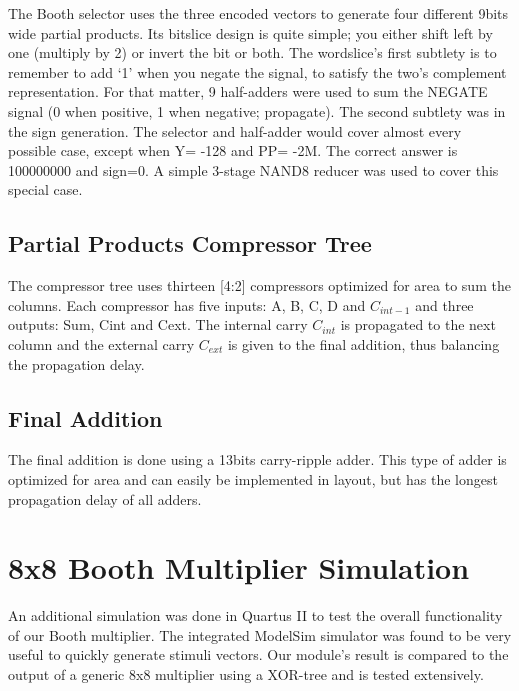 \documentclass[conference]{IEEEtran}
\begin{document}
The Booth selector uses the three encoded vectors to generate four different 9bits wide
partial products. Its bitslice design is quite simple; you either shift left by one (multiply by 2) or
invert the bit or both. The wordslice's first subtlety is to remember to add `1' when you negate
the signal, to satisfy the two's complement representation. For that matter, 9 half-adders were
used to sum the NEGATE signal (0 when positive, 1 when negative; propagate). The second
subtlety was in the sign generation. The selector and half-adder would cover almost every
possible case, except when Y= -128 and PP= -2M. The correct answer is 100000000 and sign=0.
A simple 3-stage NAND8 reducer was used to cover this special case.



\subsection{Partial Products Compressor Tree}

The compressor tree uses thirteen [4:2] compressors optimized for area to
sum the columns. Each compressor has five inputs: A, B, C, D and $C_{int-1}$ and three outputs: Sum,
Cint and Cext. The internal carry $C_{int}$ is propagated to the next column and the external carry $C_{ext}$ is
given to the final addition, thus balancing the propagation delay.


\subsection{Final Addition}

The final addition is done using a 13bits carry-ripple adder. This type of adder is
optimized for area and can easily be implemented in layout, but has the longest propagation
delay of all adders.


\section{8x8 Booth Multiplier Simulation}

An additional simulation was done in Quartus II to test the overall functionality of our Booth
multiplier. The integrated ModelSim simulator was found to be very useful to quickly generate
stimuli vectors. Our module’s result is compared to the output of a generic 8x8 multiplier using a
XOR-tree and is tested extensively.
\end{document}

